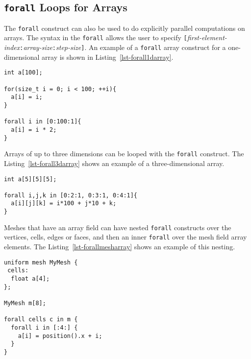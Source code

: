 \subsection{\texttt{forall} Loops for Arrays}

The \texttt{forall} construct can also be used to do explicitly parallel computations
on arrays.  The syntax in the \texttt{forall} allows the user to specify
\texttt{[}\textit{first-element-index}\texttt{:}\textit{array-size}\texttt{:}\textit{step-size}\texttt{]}.
An example of a \texttt{forall} array construct for a one-dimensional array is shown in 
Listing~\ref{lst-forall1darray}.

\par\bigskip
\begin{lstlisting}[float=h,label=lst-forall1darray,
	caption={\texttt{forall} loop construct for one-dimensional array.}]
int a[100];

for(size_t i = 0; i < 100; ++i){
  a[i] = i;
}  

forall i in [0:100:1]{
  a[i] = i * 2;
}
\end{lstlisting}
\par\bigskip\noindent

Arrays of up to three dimensions can be looped with the \texttt{forall} construct.
The Listing~\ref{lst-forall3darray} shows an example of a three-dimensional array.

\par\bigskip
\begin{lstlisting}[float=h,label=lst-forall3darray,
	caption={\texttt{forall} loop construct for three-dimensional array.}]
int a[5][5][5];

forall i,j,k in [0:2:1, 0:3:1, 0:4:1]{
  a[i][j][k] = i*100 + j*10 + k;
}
\end{lstlisting}
\par\bigskip\noindent

Meshes that have an array field can have nested \texttt{forall} constructs over the vertices,
cells, edges or faces, and then an inner \texttt{forall} over the mesh field array elements.  
The Listing~\ref{lst-forallmesharray} shows an example of this nesting.
\par\bigskip
\begin{lstlisting}[float=h,label=lst-forallmesharray,
	caption={\texttt{forall} loop construct over mesh elements and mesh field array elements.}]
uniform mesh MyMesh {
 cells:
  float a[4];
};

MyMesh m[8];

forall cells c in m {
  forall i in [:4:] {
    a[i] = position().x + i;
  }
}
\end{lstlisting}
\par\bigskip\noindent

